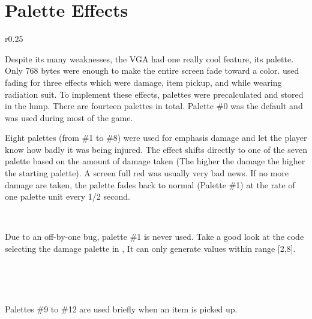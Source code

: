 \section{Palette Effects}
\label{label_palettes} \label{doom_palette}
\begin{wrapfigure}[8]{r}{0.25\textwidth}
\centering
{}
\end{wrapfigure}

Despite its many weaknesses, the VGA had one really cool feature, its palette. Only 768 bytes were enough to make the entire screen fade toward a color. \doom{} used fading for three effects which were damage, item pickup, and while wearing radiation suit. To implement these effects, palettes were precalculated and stored in the  lump. There are fourteen palettes in total. Palette \#0 was the default and was used during most of the game.\\
\par
Eight palettes (from \#1 to \#8) were used for emphasis damage and let the player know how badly it was being injured. The effect shifts directly to one of the seven palette based on the amount of damage taken (The higher the damage the higher the starting palette). A screen full red was usually very bad news. If no more damage are taken, the palette fades back to normal (Palette \#1) at the rate of one palette unit every 1/2 second.\\
\par
{}
\\
\par
Due to an off-by-one bug, palette \#1 is never used. Take a good look at the code selecting the damage palette in , It can only generate values within range [2,8].\\
\par
{}\\
\par
{}\\
\par
Palettes \#9 to \#12 are used briefly when an item is picked up.\\
\par
{}
